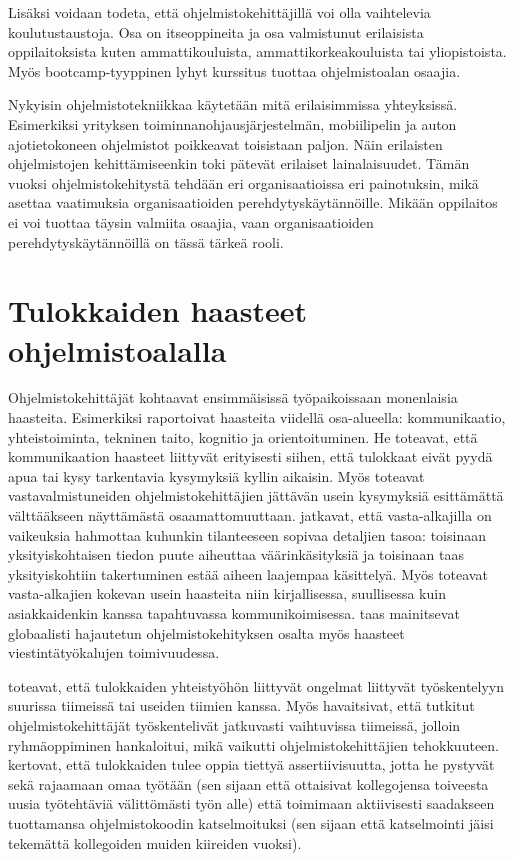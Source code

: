 \documentclass[utf8]{gradu3}
\begin{document}
Lisäksi voidaan todeta, että ohjelmistokehittäjillä voi olla vaihtelevia koulutustaustoja. Osa on itseoppineita ja osa valmistunut erilaisista oppilaitoksista kuten ammattikouluista, ammattikorkeakouluista tai yliopistoista. Myös bootcamp-tyyppinen lyhyt kurssitus tuottaa ohjelmistoalan osaajia. 

Nykyisin ohjelmistotekniikkaa käytetään mitä erilaisimmissa yhteyksissä. Esimerkiksi yrityksen toiminnanohjausjärjestelmän, mobiilipelin ja auton ajotietokoneen ohjelmistot poikkeavat toisistaan paljon. Näin erilaisten ohjelmistojen kehittämiseenkin toki pätevät erilaiset lainalaisuudet. Tämän vuoksi ohjelmistokehitystä tehdään eri organisaatioissa eri painotuksin, mikä asettaa vaatimuksia organisaatioiden perehdytyskäytännöille. Mikään oppilaitos ei voi tuottaa täysin valmiita osaajia, vaan organisaatioiden perehdytyskäytännöillä on tässä tärkeä rooli.

\section{Tulokkaiden haasteet ohjelmistoalalla}
\label{luku-tulokkaiden-haasteet}

Ohjelmistokehittäjät kohtaavat ensimmäisissä työpaikoissaan monenlaisia haasteita. Esimerkiksi \textcite{begel-simon-2008} raportoivat haasteita viidellä osa-alueella: kommunikaatio, yhteistoiminta, tekninen taito, kognitio ja orientoituminen. He toteavat, että kommunikaation haasteet liittyvät erityisesti siihen, että tulokkaat eivät pyydä apua tai kysy tarkentavia kysymyksiä kyllin aikaisin. Myös \textcite{radermacher-ym-2015} toteavat vastavalmistuneiden ohjelmistokehittäjien jättävän usein kysymyksiä esittämättä välttääkseen näyttämästä osaamattomuuttaan. \textcite{begel-simon-2008} jatkavat, että vasta-alkajilla on vaikeuksia hahmottaa kuhunkin tilanteeseen sopivaa detaljien tasoa: toisinaan yksityiskohtaisen tiedon puute aiheuttaa väärinkäsityksiä ja toisinaan taas yksityiskohtiin takertuminen estää aiheen laajempaa käsittelyä. Myös \textcite{radermacher-ym-2015} toteavat vasta-alkajien kokevan usein haasteita niin kirjallisessa, suullisessa kuin asiakkaidenkin kanssa tapahtuvassa kommunikoimisessa. \textcite{moe-ym-2020} taas mainitsevat globaalisti hajautetun ohjelmistokehityksen osalta myös haasteet viestintätyökalujen toimivuudessa.

\textcite{begel-simon-2008} toteavat, että tulokkaiden yhteistyöhön liittyvät ongelmat liittyvät työskentelyyn suurissa tiimeissä tai useiden tiimien kanssa. Myös \textcite{britto-ym-2019} havaitsivat, että tutkitut ohjelmistokehittäjät työskentelivät jatkuvasti vaihtuvissa tiimeissä, jolloin ryhmäoppiminen hankaloitui, mikä vaikutti ohjelmistokehittäjien tehokkuuteen. \textcite{begel-simon-2008} kertovat, että tulokkaiden tulee oppia tiettyä assertiivisuutta, jotta he pystyvät sekä rajaamaan omaa työtään (sen sijaan että ottaisivat kollegojensa toiveesta uusia työtehtäviä välittömästi työn alle) että toimimaan aktiivisesti saadakseen tuottamansa ohjelmistokoodin katselmoituksi (sen sijaan että katselmointi jäisi tekemättä kollegoiden muiden kiireiden vuoksi).
\end{document}
